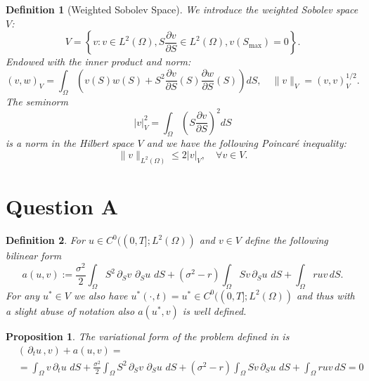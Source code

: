 \documentclass{article}
\newtheorem{df}{Definition}[section]
\newtheorem{prop}[thm]{Proposition}
\newcommand{\intS}[1]{\ensuremath{\int_{\Omega}#1 \, dS}}
\newcommand{\darg}[2]{\ensuremath{\, \partial_{#2}#1} \, }
\newcommand{\dt}[1]{\ensuremath{\darg{#1}{t}}}
\newcommand{\dS}[1]{\ensuremath{\darg{#1}{S}}}
\newcommand{\dtu}{\dt{u}}
\newcommand{\sigmafrac}{\ensuremath{\frac{\sigma^2}{2}}}
\newcommand{\czero}{\ensuremath{C^0((0,T];L^2(\Omega))}}
\newcommand{\aform}[2]{\ensuremath{\sigmafrac \intS{S^2 \dS{#2} \dS{#1}} + (\sigma^2 - r) \intS{S #2 \dS{#1}} + \intS{r  #1  #2}}}
\newcommand{\auv}{\aform{u}{v}}
\begin{document}
\begin{df}[Weighted Sobolev Space]
We introduce the weighted Sobolev space \( V \):
\[
V = \left\{ v : v \in L^2(\Omega), S \frac{\partial v}{\partial S} \in L^2(\Omega), v(S_{\max}) = 0 \right\}.
\]
Endowed with the inner product and norm:
\[
(v, w)_V = \int_\Omega \left( v(S) w(S) + S^2 \frac{\partial v}{\partial S}(S) \frac{\partial w}{\partial S}(S) \right) dS, \quad \| v \|_V = (v, v)_V^{1/2}.
\]
The seminorm
\[
|v|_V^2 = \int_\Omega \left( S \frac{\partial v}{\partial S} \right)^2 dS
\]
is a norm in the Hilbert space \( V \) and we have the following Poincaré inequality:
\[
\| v \|_{L^2(\Omega)} \leq 2 |v|_V, \quad \forall v \in V.
\]
\end{df}

\section{Question A}
\begin{df}\label{def:a}
    For $u \in \czero$ and $v \in V$ define the following bilinear form
    \begin{equation*}
        a(u,v) := \auv.
    \end{equation*}
    For any $u^* \in V$ we also have $u^{*}(\cdot, t) = u^* \in \czero$ and thus with a slight abuse of notation also $a(u^*,v)$ is well defined.
\end{df}
\begin{prop}\label{prop:variational_form}
    The variational form of the problem defined in  is
    \begin{align*}
    &\left( \dtu, v\right) + a(u,v) = \\
    &= \intS{v \dtu} + \auv = 0
    \end{align*}
\end{prop}
\end{document}
